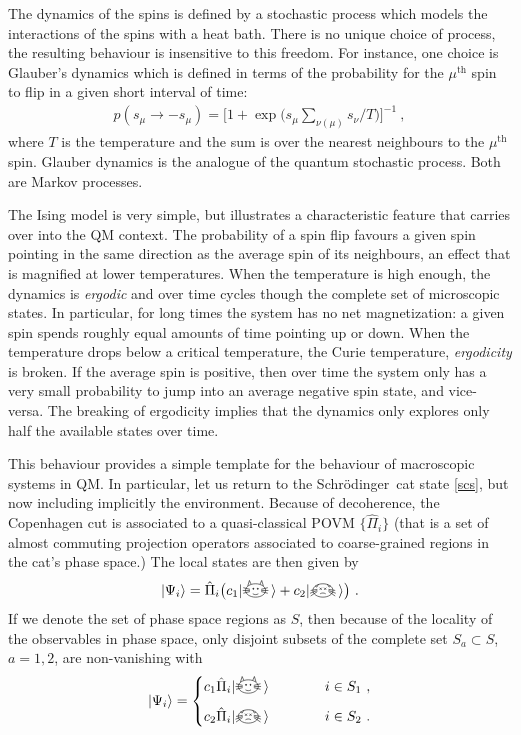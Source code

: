 \documentclass[12pt]{article}
\theoremstyle{plain}
\theoremstyle{definition}
\theoremstyle{remark}
\def\SCH{Schr\"odinger\ }
\def\ket#1{| #1\rangle}
\def\LCATH{\raisebox{-2pt}{\begin{tikzpicture}[scale=0.14]
\draw (0,0) ellipse (1.8cm and 1.2cm);
\draw [-] (1,0) -- (2.3,0);
\draw [-] (-1,0) -- (-2.3,0);
\draw [-] (1,-0.2) -- (2.2,-0.5);
\draw [-] (-1,-0.2) -- (-2.2,-0.5);
\draw [-] (1,0.2) -- (2.2,0.5);
\draw [-] (-1,0.2) -- (-2.2,0.5);
\filldraw[black] (0.4,0.3) circle (0.1cm);
\filldraw[black] (-0.4,0.3) circle (0.1cm);
\draw[-] (-0.5,-0.6) to[out=-30,in=210] (0.5,-0.6);
\draw[-] (0.8,1.1) -- (1.1,1.8) -- (1.4,0.8);
\draw[-] (-0.8,1.1) -- (-1.1,1.8) -- (-1.4,0.8);
\end{tikzpicture}
}\!}
\def\DCATH{\raisebox{-2pt}{\begin{tikzpicture}[scale=0.14]
\draw (0,0) ellipse (1.8cm and 1.2cm);
\draw [-] (1,0) -- (2.3,-0.5);
\draw [-] (-1,0) -- (-2.3,-0.5);
\draw [-] (1,-0.2) -- (2.2,-1);
\draw [-] (-1,-0.2) -- (-2.2,-1);
\draw [-] (1,0.2) -- (2.2,0);
\draw [-] (-1,0.2) -- (-2.2,0);
\draw[-] (0.2,0.1) -- (0.6,0.5);
\draw[-] (0.2,0.5) -- (0.6,0.1);
\draw[-] (-0.2,0.1) -- (-0.6,0.5);
\draw[-] (-0.2,0.5) -- (-0.6,0.1);
\draw[-]  (-0.5,-0.6) to[out=30,in=150] (0.5,-0.6);
\draw[-] (0.8,1.1) -- (1.1,0.6) -- (1.4,0.8);
\draw[-] (-0.8,1.1) -- (-1.1,0.6) -- (-1.4,0.8);
\end{tikzpicture}
}\!}
\newcommand{\EQ}[1]{\begin{equation}\begin{split} #1
\end{split}\end{equation}}
\begin{document}
The dynamics of the spins is defined by a stochastic process which models the interactions of the spins with a heat bath. There is no unique choice of process, the resulting behaviour is insensitive to this freedom.
For instance, one choice is Glauber's dynamics \cite{Glauber} which is defined in terms of the probability for the $\mu^\text{th}$ spin to flip in a given short interval of time:
\EQ{
p(s_\mu\to-s_\mu)=\Big[1+\exp\big(s_\mu\sum_{\nu(\mu)}s_\nu/T\big)\Big]^{-1}\ ,
}
where $T$ is the temperature and the sum is over the nearest neighbours to the $\mu^\text{th}$ spin. Glauber dynamics is the analogue of the quantum stochastic process. Both are Markov processes.

The Ising model is very simple, but illustrates a characteristic feature that carries over into the QM context. The probability of a spin flip favours a given spin pointing in the same direction as the average spin of its neighbours, an effect that is magnified at lower temperatures.
When the temperature is high enough, the dynamics is {\it ergodic\/} and over time cycles though the complete set of microscopic states. In particular, for long times the system has no net magnetization: a given spin spends roughly equal amounts of time pointing up or down. When the temperature drops below a critical temperature, the Curie temperature, {\it ergodicity\/} is broken. If the average spin is positive, then over time the system only has a very small probability to jump into an average negative spin state, and vice-versa. The breaking of ergodicity implies that the dynamics only explores only half the available states over time. 

This behaviour provides a simple template for the behaviour of macroscopic systems in QM. In particular, let us return to the \SCH cat state \eqref{scs}, but now including implicitly the environment. Because of decoherence, the Copenhagen cut is associated to a quasi-classical POVM $\{\hat\Pi_i\}$ (that is a set of almost commuting projection operators associated to coarse-grained regions in the cat's phase space.) The local states are then given by
\EQ{
\ket{\Psi_i}=\hat\Pi_i\big(c_1\ket{\LCATH}+c_2\ket{\DCATH}\big)\ .
\label{scs2}
}
If we denote the set of phase space regions as $S$, then
because of the locality of the observables in phase space, only disjoint subsets of the complete set $S_a\subset S$, $a=1,2$, are non-vanishing with
\EQ{
\ket{\Psi_i}=\begin{cases}c_1\hat\Pi_i\ket{\LCATH} \quad\qquad&i\in S_1\ ,\\[7pt] c_2\hat\Pi_i\ket{\DCATH} &i\in S_2\ .\end{cases}
}
\end{document}
